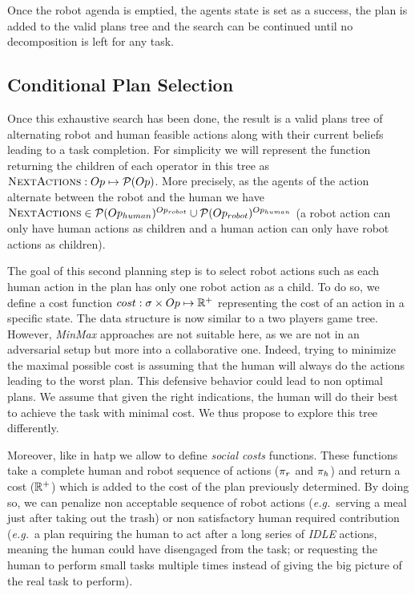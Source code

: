 \documentclass[a4paper,11pt,twoside]{StyleThese}
\begin{document}
Once the robot agenda is emptied, the agents state is set as a success, the plan is added to the valid plans tree and the search can be continued until no decomposition is left for any task.


\subsection{Conditional Plan Selection}
Once this exhaustive search has been done, the result is a valid plans tree of alternating robot and human feasible actions along with their current beliefs leading to a task completion. For simplicity we will represent the function returning the children of each operator in this tree as $\textsc{NextActions}: Op \mapsto \mathcal{P}(Op)$. More precisely, as the agents of the action alternate between the robot and the human we have $\textsc{NextActions} \in \mathcal{P}(Op_{human})^{Op_{robot}} \cup \mathcal{P}(Op_{robot})^{Op_{human}}$ (a robot action can only have human actions as children and a human action can only have robot actions as children). 

The goal of this second planning step is to select robot actions such as each human action in the plan has only one robot action as a child.
To do so, we define a cost function $cost: \sigma \times Op \mapsto \mathbb{R}^+$ representing the cost of an action in a specific state. The data structure is now similar to a two players game tree. However, \textit{MinMax} approaches are not suitable here, as we are not in an adversarial setup but more into a collaborative one. Indeed, trying to minimize the maximal possible cost is assuming that the human will always do the actions leading to the worst plan. This defensive behavior could lead to non optimal plans. We assume that given the right indications, the human will do their best to achieve the task with minimal cost. We thus propose to explore this tree differently.

Moreover, like in \acrshort{hatp} we allow to define \textit{social costs} functions. These functions take a complete human and robot sequence of actions ($\pi_r$ and $\pi_h$) and return a cost ($\mathbb{R}^+$) which is added to the cost of the plan previously determined. By doing so, we can penalize non acceptable sequence of robot actions (\textit{e.g.}~serving a meal just after taking out the trash) or non satisfactory human required contribution (\textit{e.g.}~a plan requiring the human to act after a long series of \textit{IDLE} actions, meaning the human could have disengaged from the task; or requesting the human to perform small tasks multiple times instead of giving the big picture of the real task to perform).
\end{document}
